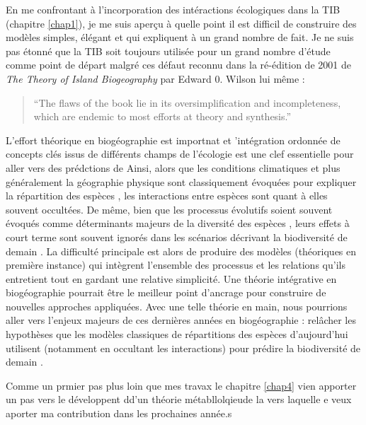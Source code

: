 En me confrontant à l'incorporation des intéractions écologiques dans la
TIB (chapitre \ref{chap1}), je me suis aperçu à quelle point il est
difficil de construire des modèles simples, élégant et qui expliquent à
un grand nombre de fait. Je ne suis pas étonné que la TIB soit toujours
utilisée pour un grand nombre d'étude comme point de départ malgré ces
défaut reconnu dans la ré-édition de 2001 de \emph{The Theory of Island
Biogeography} par Edward 0. Wilson lui même :

\begin{quote}
``The flaws of the book lie in its oversimplification and
incompleteness, which are endemic to most efforts at theory and
synthesis.''
\end{quote}

L'effort théorique en biogéographie est importnat et 'intégration
ordonnée de concepts clés issus de différents champs de l'écologie
\cite{Thuiller2013} est une clef essentielle pour aller vers des
prédctions de Ainsi, alors que les conditions climatiques et plus
généralement la géographie physique sont classiquement évoquées pour
expliquer la répartition des espèces \cite{Kearney2004}, les
interactions entre espèces sont quant à elles souvent occultées. De
même, bien que les processus évolutifs soient souvent évoqués comme
déterminants majeurs de la diversité des espèces \cite{Rosindell2011},
leurs effets à court terme sont souvent ignorés \cite{Parmesan2006} dans
les scénarios décrivant la biodiversité de demain \cite{Lavergne2010}.
La difficulté principale est alors de produire des modèles (théoriques
en première instance) qui intègrent l'ensemble des processus et les
relations qu'ils entretient \cite{Thuiller2013} tout en gardant une
relative simplicité. Une théorie intégrative en biogéographie pourrait
être le meilleur point d'ancrage pour construire de nouvelles approches
appliquées. Avec une telle théorie en main, nous pourrions aller vers
l'enjeux majeurs de ces dernières années en biogéographie : relâcher les
hypothèses que les modèles classiques de répartitions des espèces
d'aujourd'hui utilisent (notamment en occultant les interactions) pour
prédire la biodiversité de demain \cite{Guisan2011}.

Comme un prmier pas plus loin que mes travax le chapitre \ref{chap4}
vien apporter un pas vers le développent dd'un théorie métabllolqieude
la vers laquelle e veux aporter ma contribution dans les prochaines
année.s

